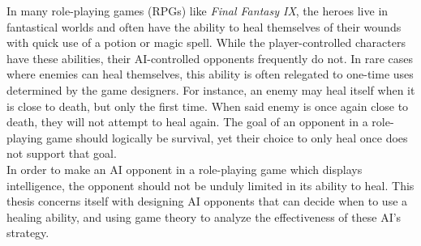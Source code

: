 In many role-playing games (RPGs) like \textit{Final Fantasy IX}, the heroes live in fantastical worlds and often have the ability to heal themselves of their wounds with quick use of a potion or magic spell. While the player-controlled characters have these abilities, their AI-controlled opponents frequently do not. In rare cases where enemies can heal themselves, this ability is often relegated to one-time uses determined by the game designers. For instance, an enemy may heal itself when it is close to death, but only the first time. When said enemy is once again close to death, they will not attempt to heal again. The goal of an opponent in a role-playing game should logically be survival, yet their choice to only heal once does not support that goal.\\

In order to make an AI opponent in a role-playing game which displays intelligence, the opponent should not be unduly limited in its ability to heal. This thesis concerns itself with designing AI opponents that can decide when to use a healing ability, and using game theory to analyze the effectiveness of these AI's strategy.